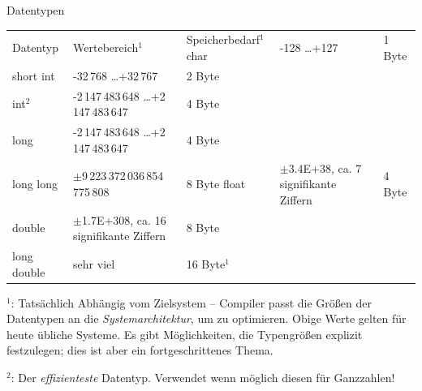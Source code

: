 \begin{frame}{Datentypen}
%
\begin{table}
	\small
	\begin{tabularx}
		{\linewidth}
		{SBS}
		\toprule[1pt]
		
		Datentyp    & Wertebereich${}^1$ & Speicherbedarf${}^1$ \tabcrlf
		char        &               -128 \ldots              +127 & 1 Byte\\
		short int   &           -32\,768 \ldots          +32\,767 & 2 Byte\\
		int${}^2$   &  -2\,147\,483\,648 \ldots +2\,147\,483\,647 & 4 Byte\\
		long        &  -2\,147\,483\,648 \ldots +2\,147\,483\,647 & 4 Byte\\
		long long   & $\pm$9\,223\,372\,036\,854\,775\,808        & 8 Byte\tabcrlf
		float       & $\pm$3.4E+38, ca. 7 signifikante Ziffern    & 4 Byte\\	
		double      & $\pm$1.7E+308, ca. 16 signifikante Ziffern  & 8 Byte\\
		long double & sehr viel                                   & 16 Byte${}^1$
	\end{tabularx}
\end{table}
\tiny ${}^1$: Tatsächlich Abhängig vom Zielsystem -- Compiler passt die Größen der Datentypen an die \emph{Systemarchitektur}, um zu optimieren. Obige Werte gelten für heute übliche Systeme. Es gibt Möglichkeiten, die Typengrößen explizit festzulegen; dies ist aber ein fortgeschrittenes Thema.

\tiny ${}^2$: Der \emph{effizienteste} Datentyp. Verwendet wenn möglich diesen für Ganzzahlen!
%
\end{frame}



